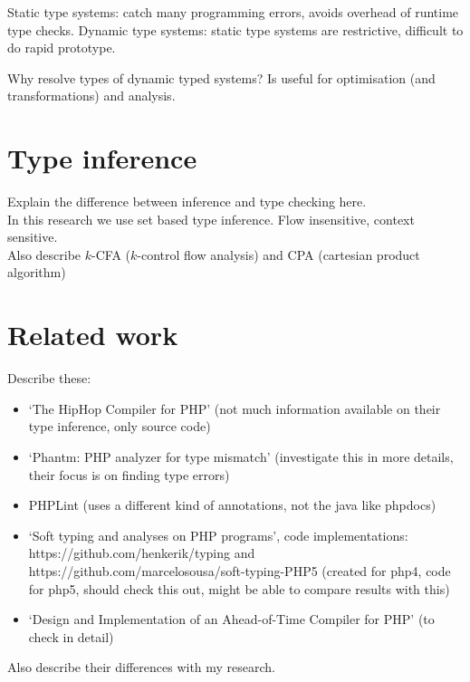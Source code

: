 \documentclass[../main.tex]{subfiles}
\begin{document}
    Static type systems: catch many programming errors, avoids overhead of runtime type checks.
    Dynamic type systems: static type systems are restrictive, difficult to do rapid prototype.
    
    Why resolve types of dynamic typed systems?
    Is useful for optimisation (and transformations) and analysis.
    
    \section{Type inference}
    Explain the difference between inference and type checking here.
    \\
    In this research we use set based type inference.
    Flow insensitive, context sensitive.
    \\
    Also describe $k$-CFA ($k$-control flow analysis) and CPA (cartesian product algorithm)
    
    
    
    \section{Related work}
    Describe these:
    \begin{itemize}
        \item `The HipHop Compiler for PHP'\cite{Zhao:12} (not much information available on their type inference, only source code)
        \item `Phantm: PHP analyzer for type mismatch'\cite{Kne:10,Bar:10} (investigate this in more details, their focus is on finding type errors)
        \item PHPLint \footnotemark (uses a different kind of annotations, not the java like phpdocs)
        \item `Soft typing and analyses on PHP programs'\cite{}, code implementations: https://github.com/henkerik/typing and https://github.com/marcelosousa/soft-typing-PHP5 (created for php4, code for php5, should check this out, might be able to compare results with this)
        \item `Design and Implementation of an Ahead-of-Time Compiler for PHP'\cite{Big:10} (to check in detail)
    \end{itemize}
    Also describe their differences with my research.
    
\end{document}
